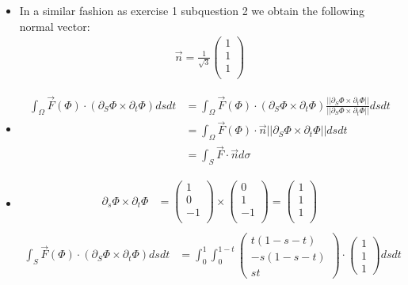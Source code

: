 \documentclass[11pt]{article}
\begin{document}
\begin{solution}     
    \begin{itemize}
     \item  In a similar fashion as exercise 1 subquestion 2 we obtain the following normal vector:
	\begin{align*}
		\vec{n} = \frac{1}{\sqrt{3}} \begin{pmatrix}1\\1\\1\\\end{pmatrix}
	\end{align*}
     \item
	\begin{align*}
	\int_{\Omega} \vec{F}(\Phi) \cdot  ( \partial_S \Phi \times \partial_t \Phi ) dsdt &=\int_{\Omega} \vec{F}(\Phi) \cdot  ( \partial_S \Phi \times \partial_t \Phi )\frac{||\partial_S \Phi \times \partial_t \Phi ||}{||\partial_S \Phi \times \partial_t \Phi ||} dsdt \\
	&=\int_{\Omega} \vec{F}(\Phi) \cdot \vec{n}||\partial_S \Phi \times \partial_t \Phi || dsdt \\
	&=\int_S \vec{F}\cdot \vec{n} d\sigma
	\end{align*}
     \item
	\begin{align*}
     \partial_s\Phi\times\partial_t\Phi &= \begin{pmatrix}1\\0\\-1\\\end{pmatrix}\times\begin{pmatrix}0\\1\\-1\\\end{pmatrix} = \begin{pmatrix}1\\1\\1\\\end{pmatrix}\\
     \end{align*}
	\begin{align*}
	\int_S \vec{F}(\Phi) \cdot  ( \partial_S \Phi \times \partial_t \Phi ) dsdt &= \int_0^1 \int_0^{1-t} \begin{pmatrix}t(1-s-t)\\-s(1-s-t)\\st\end{pmatrix}\cdot  \begin{pmatrix}1\\1\\1\end{pmatrix} ds dt\\

\end{align*}
\end{itemize}
\end{solution}
\end{document}
